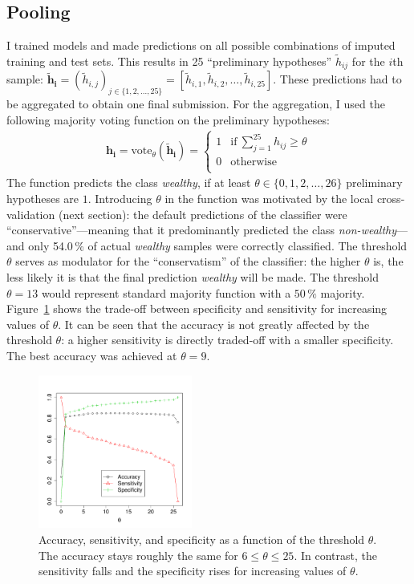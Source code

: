 \documentclass[a4paper,11pt]{article}
\begin{document}
\subsection{Pooling}
\label{sec:pooling}

I trained models and made predictions on all possible combinations of
imputed training and test sets. This results in 25 ``preliminary
hypotheses'' $\tilde{h}_{ij}$ for the $i$th sample:
$\mathbf{\tilde{h}_i} = (\tilde{h}_{i,j})_{j \in \{1, 2, \ldots, 25\}}
= [\tilde{h}_{i,1}, \tilde{h}_{i,2}, \ldots, \tilde{h}_{i,25}]$. These
predictions had to be aggregated to obtain one final submission. For
the aggregation, I used the following majority voting function on the
preliminary hypotheses:
\begin{align}
\mathbf{h_i} = \text{vote}_\theta(\mathbf{\tilde{h}_i}) =
\begin{cases}
1 & \text{if}~\sum_{j = 1}^{25} h_{ij} \geq \theta\\
0 & \text{otherwise }\\
\end{cases}
\end{align}
The function predicts the class \emph{wealthy}, if at least
$\theta \in \{0, 1, 2, \ldots, 26\}$ preliminary hypotheses are
$1$. Introducing $\theta$ in the function was motivated by the local
cross-validation (next section): the default predictions of the
classifier were ``conservative''---meaning that it predominantly
predicted the class \emph{non-wealthy}---and only 54.0\,\% of actual
\emph{wealthy} samples were correctly classified. The threshold
$\theta$ serves as modulator for the ``conservatism'' of the
classifier: the higher $\theta$ is, the less likely it is that the
final prediction \emph{wealthy} will be made. The threshold
$\theta = 13$ would represent standard majority function with a
$50\,\%$ majority.  Figure~\ref{fig:tuning} shows the trade-off
between specificity and sensitivity for increasing values of
$\theta$. It can be seen that the accuracy is not greatly affected by
the threshold $\theta$: a higher sensitivity is directly traded-off
with a smaller specificity. The best accuracy was achieved at
$\theta = 9$.

\begin{figure}[h]
  \centering
  \includegraphics[width=0.45\textwidth]{../Python/theta}
  \caption{Accuracy, sensitivity, and specificity as a function of the
    threshold $\theta$. The accuracy stays roughly the same for
    $6 \leq \theta \leq 25$. In contrast, the sensitivity falls and
    the specificity rises for increasing values of $\theta$.}
  \label{fig:tuning}
\end{figure}
\end{document}
